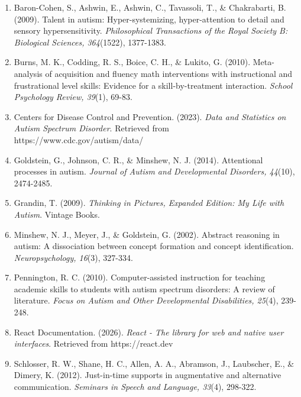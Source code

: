 \documentclass[12pt, a4paper]{article}
\begin{document}
\begin{enumerate}[leftmargin=*]
    \item Baron-Cohen, S., Ashwin, E., Ashwin, C., Tavassoli, T., \& Chakrabarti, B. (2009). Talent in autism: Hyper-systemizing, hyper-attention to detail and sensory hypersensitivity. \textit{Philosophical Transactions of the Royal Society B: Biological Sciences, 364}(1522), 1377-1383.
    
    \item Burns, M. K., Codding, R. S., Boice, C. H., \& Lukito, G. (2010). Meta-analysis of acquisition and fluency math interventions with instructional and frustrational level skills: Evidence for a skill-by-treatment interaction. \textit{School Psychology Review, 39}(1), 69-83.
    
    \item Centers for Disease Control and Prevention. (2023). \textit{Data and Statistics on Autism Spectrum Disorder}. Retrieved from https://www.cdc.gov/autism/data/
    
    \item Goldstein, G., Johnson, C. R., \& Minshew, N. J. (2014). Attentional processes in autism. \textit{Journal of Autism and Developmental Disorders, 44}(10), 2474-2485.
    
    \item Grandin, T. (2009). \textit{Thinking in Pictures, Expanded Edition: My Life with Autism}. Vintage Books.
    
    \item Minshew, N. J., Meyer, J., \& Goldstein, G. (2002). Abstract reasoning in autism: A dissociation between concept formation and concept identification. \textit{Neuropsychology, 16}(3), 327-334.
    
    \item Pennington, R. C. (2010). Computer-assisted instruction for teaching academic skills to students with autism spectrum disorders: A review of literature. \textit{Focus on Autism and Other Developmental Disabilities, 25}(4), 239-248.
    
    \item React Documentation. (2026). \textit{React - The library for web and native user interfaces}. Retrieved from https://react.dev
    
    \item Schlosser, R. W., Shane, H. C., Allen, A. A., Abramson, J., Laubscher, E., \& Dimery, K. (2012). Just-in-time supports in augmentative and alternative communication. \textit{Seminars in Speech and Language, 33}(4), 298-322.
    

\end{enumerate}
\end{document}
